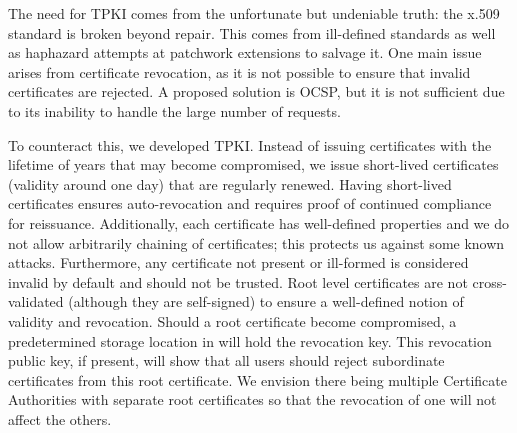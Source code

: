 The need for TPKI comes from the unfortunate but undeniable truth:
the x.509 standard is broken beyond repair.
This comes from ill-defined standards as well as haphazard attempts
at patchwork extensions to salvage it.
One main issue arises from certificate revocation, as it is not
possible to ensure that invalid certificates are rejected.
A proposed solution is OCSP, but it is not sufficient due to its
inability to handle the large number of requests.

To counteract this, we developed TPKI.
Instead of issuing certificates with the lifetime of years that
may become compromised, we issue short-lived certificates (validity
around one day) that are regularly renewed.
Having short-lived certificates ensures auto-revocation and requires
proof of continued compliance for reissuance.
Additionally, each certificate has well-defined properties and we
do not allow arbitrarily chaining of certificates; this protects
us against some known attacks.
Furthermore, any certificate not present or ill-formed is considered
invalid by default and should not be trusted.
Root level certificates are not cross-validated (although they
are self-signed) to ensure a well-defined notion of validity
and revocation.
Should a root certificate become compromised, a predetermined storage
location in \LayerTwoLong{} will hold the revocation key.
This revocation public key, if present, will show that all users
should reject subordinate certificates from this root certificate.
We envision there being multiple Certificate Authorities with separate
root certificates so that the revocation of one will not affect
the others.

